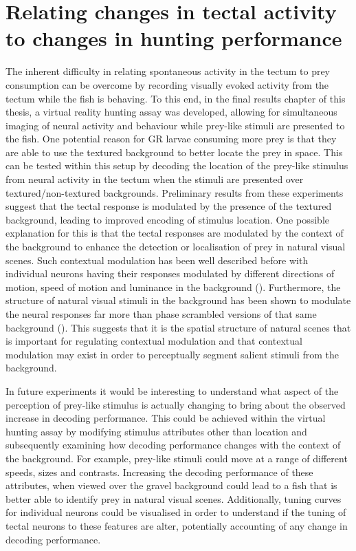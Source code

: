 \section{Relating changes in tectal activity to changes in hunting performance}
The inherent difficulty in relating spontaneous activity in the tectum to prey consumption can be overcome by recording visually evoked activity from the tectum while the fish is behaving. To this end, in the final results chapter of this thesis, a virtual reality hunting assay was developed, allowing for simultaneous imaging of neural activity and behaviour while prey-like stimuli are presented to the fish. One potential reason for GR larvae consuming more prey is that they are able to use the textured background to better locate the prey in space. This can be tested within this setup by decoding the location of the prey-like stimulus from neural activity in the tectum when the stimuli are presented over textured/non-textured backgrounds. Preliminary results from these experiments suggest that the tectal response is modulated by the presence of the textured background, leading to improved encoding of stimulus location. One possible explanation for this is that the tectal responses are modulated by the context of the background to enhance the detection or localisation of prey in natural visual scenes. Such contextual modulation has been well described before with individual neurons having their responses modulated by different directions of motion, speed of motion and luminance in the background (\cite{Krause2014ContextualCortex, Sun2002ContextualPigeons, Sun2006ONRetina}). Furthermore, the structure of natural visual stimuli in the background has been shown to modulate the neural responses far more than phase scrambled versions of that same background (\cite{Guo2005Centre-surroundCortex}). This suggests that it is the spatial structure of natural scenes that is important for regulating contextual modulation and that contextual modulation may exist in order to perceptually segment salient stimuli from the background. 

In future experiments it would be interesting to understand what aspect of the perception of prey-like stimulus is actually changing to bring about the observed increase in decoding performance. This could be achieved within the virtual hunting assay by modifying stimulus attributes other than location and subsequently examining how decoding performance changes with the context of the background.  For example, prey-like stimuli could move at a range of different speeds, sizes and contrasts. Increasing the decoding performance of these attributes, when viewed over the gravel background could lead to a fish that is better able to identify prey in natural visual scenes. Additionally, tuning curves for individual neurons could be visualised in order to understand if the tuning of tectal neurons to these features are alter, potentially accounting of any change in decoding performance. 

